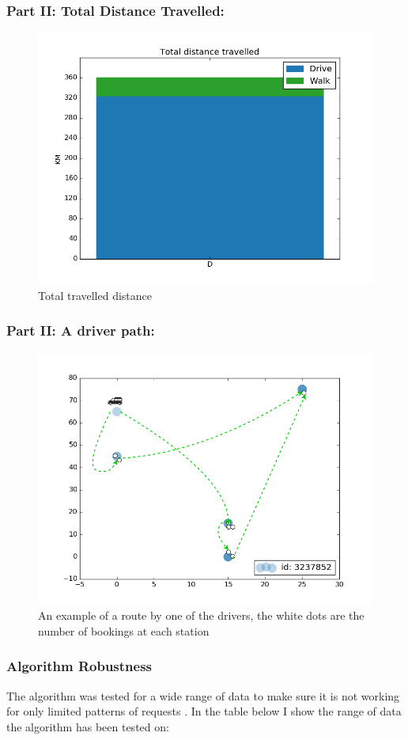 \documentclass{article}
\begin{document}
\subsubsection*{Part II: Total Distance Travelled: }
\begin{figure}[H]
    \centering 
  \includegraphics[width=0.7\linewidth]{pictures/results/Example5}
  \caption{Total travelled distance}
\label{fig:td}
\end{figure}


\subsubsection*{Part II: A driver path:}
\begin{figure}[H]
    \centering 
  \includegraphics[width=0.7\linewidth]{pictures/results/chart_2}
  \caption{An example of a route by one of the drivers, the white dots are the number of bookings at each station}
\label{fig:driver_path}
\end{figure}


\subsubsection*{Algorithm Robustness}
The algorithm was tested for a wide range of data to make sure it is not working for only limited patterns of requests . In the table below I show the range of data the algorithm has been tested on:
\end{document}
